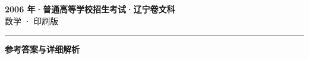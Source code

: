 \documentclass[zihao=5, a4paper]{ctexart}
\begin{document}
\begin{center}
  {\Large\bfseries 2006 年·普通高等学校招生考试·辽宁卷文科}\\[4pt]
  {\large 数学 · 印刷版}
\end{center}
\medskip
{}

\par\bigskip\hrule\bigskip
{}
\begin{center}{\large\bfseries 参考答案与详细解析}\end{center}
\smallskip

\end{document}
